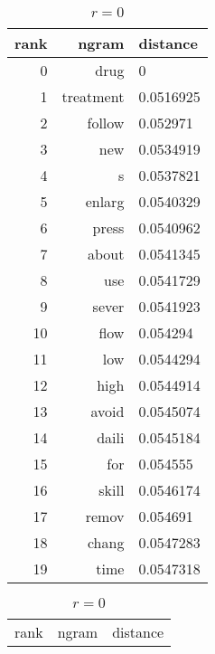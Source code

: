 \begin{table}[ht]
    \begin{subtable}[t]{.45\textwidth}
        \centering
        \begin{tabularx}{\textwidth}{r R l}
            \toprule
            rank & ngram & distance\\
            \midrule
            \num{0} & drug & \num{0}\\
            \num{1} & treatment & \num{0.0516925}\\
            \num{2} & follow & \num{0.052971}\\
            \num{3} & new & \num{0.0534919}\\
            \num{4} & s & \num{0.0537821}\\
            \num{5} & enlarg & \num{0.0540329}\\
            \num{6} & press & \num{0.0540962}\\
            \num{7} & about & \num{0.0541345}\\
            \num{8} & use & \num{0.0541729}\\
            \midrule
            \num{9} & sever & \num{0.0541923}\\
            \num{10} & flow & \num{0.054294}\\
            \num{11} & low & \num{0.0544294}\\
            \num{12} & high & \num{0.0544914}\\
            \num{13} & avoid & \num{0.0545074}\\
            \num{14} & daili & \num{0.0545184}\\
            \num{15} & for & \num{0.054555}\\
            \num{16} & skill & \num{0.0546174}\\
            \num{17} & remov & \num{0.054691}\\
            \num{18} & chang & \num{0.0547283}\\
            \num{19} & time & \num{0.0547318}\\
            \bottomrule
        \end{tabularx}
        \caption{$r = 0$}\label{tab:ranking_drug_r0}
    \end{subtable}
    \hfill
    \begin{subtable}[t]{.45\textwidth}
        \centering
        \begin{tabularx}{\textwidth}{r R l}
            \toprule
            rank & ngram & distance\\

\end{tabularx}
\end{subtable}
\end{table}
